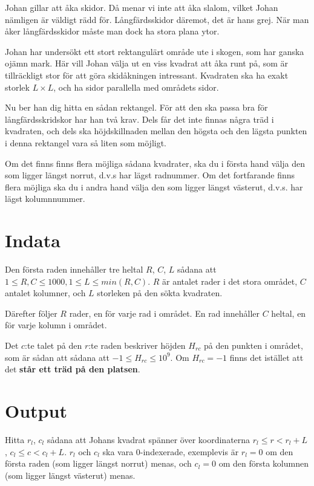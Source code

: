 Johan gillar att åka skidor.
Då menar vi inte att åka slalom, vilket Johan nämligen är väldigt rädd för.
Långfärdsskidor däremot, det är hans grej.
När man åker långfärdsskidor måste man dock ha stora plana ytor.

Johan har undersökt ett stort rektangulärt område ute i skogen, som har ganska ojämn mark.
Här vill Johan välja ut en viss kvadrat att åka runt på, som är tillräckligt stor för att göra skidåkningen intressant.
Kvadraten ska ha exakt storlek $L \times L$, och ha sidor parallella med områdets sidor.

Nu ber han dig hitta en sådan rektangel.
För att den ska passa bra för långfärdsskridskor har han två krav.
Dels får det inte finnas några träd i kvadraten, och dels ska höjdskillnaden mellan den högsta och den lägsta punkten i denna rektangel vara så liten som möjligt.

Om det finns finns flera möjliga sådana kvadrater, ska du i första hand välja den som ligger längst norrut, d.v.s har lägst radnummer. Om det fortfarande finns flera möjliga
ska du i andra hand välja den som ligger längst västerut, d.v.s. har lägst kolumnnummer.

\section*{Indata}
Den första raden innehåller tre heltal $R$, $C$, $L$ sådana att $1\leq R,C \leq 1000, 1 \leq L \leq min(R,C)$.
$R$ är antalet rader i det stora området, $C$ antalet kolumner, och $L$ storleken på den sökta kvadraten.

Därefter följer $R$ rader, en för varje rad i området. En rad innehåller $C$ heltal, en för varje kolumn i området.

Det $c$:te talet på den $r$:te raden beskriver höjden $H_{rc}$ på den punkten i området, som är sådan att sådana att $-1 \leq H_{rc} \leq 10^9$.
Om $H_{rc} = -1$ finns det istället att det \textbf{står ett träd på den platsen}.

\section*{Output}
Hitta $r_l$, $c_l$ sådana att Johans kvadrat spänner över koordinaterna $r_l \leq r <r_l + L$, $c_l \leq c < c_l + L$. $r_l$ och $c_l$ ska vara 0-indexerade, exemplevis är $r_l = 0$ om den första raden (som ligger längst norrut) menas, och $c_l = 0$ om den första kolumnen (som ligger längst västerut) menas.


